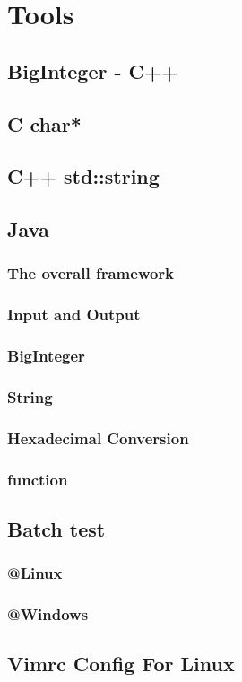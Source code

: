 \section{Tools}
	\subsection{BigInteger - C++}
		
	\subsection{C char*}
		
	\subsection{C++ std::string}
		
	\subsection{Java}
		\subsubsection{The overall framework}
			
		\subsubsection{Input and Output}
			
		\subsubsection{BigInteger}
			
		\subsubsection{String}
			
		\subsubsection{Hexadecimal Conversion}
			
		\subsubsection{function}
			
	\subsection{Batch test}
		\subsubsection{@Linux}
			
		\subsubsection{@Windows}
			
	\subsection{Vimrc Config For Linux}
		
